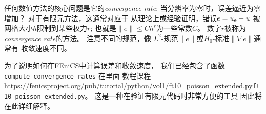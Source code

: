 
任何数值方法的核心问题是它的\emph{convergence rate}:
当分辨率为零时，误差逼近为零
增加？ 对于有限元方法，这通常对应于
从理论上或经验证明，错误$e = \uex - u$
被网格大小$h$限制到某些权力$r$; 也就是$\|e\|
\leq C h^r$为一些常数$C$。 数字$r$被称为
\emph{convergence rate}的方法。 注意不同的规范，像
$L^2$-规范$\|e\|$或$H^1_0$-标准$\|\nabla e\|$通常有
收敛速度不同。

为了说明如何在FEniCS中计算误差和收敛速度，
我们已经包含了函数\verb!compute_convergence_rates! 在里面
教程课程
\url{https://fenicsproject.org/pub/tutorial/python/vol1/ft10_poisson_extended.py}{\nolinkurl{ft10_poisson_extended.py}}。
这是一种在验证有限元代码时非常方便的工具
因此将在此详细解释。

